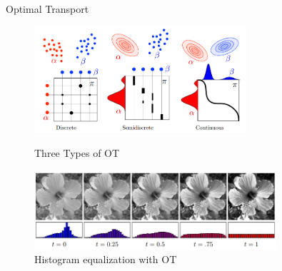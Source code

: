 \begin{frame}{Optimal Transport}
    \vspace{-1em}
    \begin{figure}
        \begin{minipage}[t]{0.48\textwidth}
            \vspace{0pt}
            \centering
            \captionsetup{font=tiny}
            \includegraphics[width=0.7\textwidth]{png/3TypesOfOT.png}
            \vspace{-.7em}
            \caption{Three Types of OT}
        \end{minipage}
        \begin{minipage}[t]{0.5\textwidth}
            \vspace{0pt}
            \centering
            \captionsetup{font=tiny}
            \includegraphics[width=0.8\textwidth]{png/HistogramEqualization.png}
            \vspace{-.7em}
            \caption{Histogram equalization with OT}
        \end{minipage}
    \end{figure}
\end{frame}